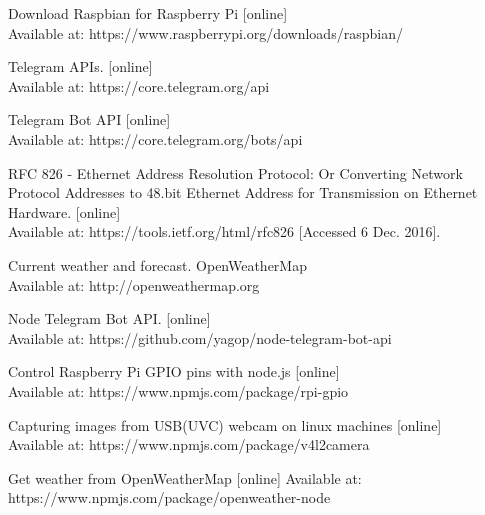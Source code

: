 \documentclass[10pt,journal,compsoc]{IEEEtran}
\begin{document}
\begin{thebibliography}{1}

Download Raspbian for Raspberry Pi [online] \\
Available at: https://www.raspberrypi.org/downloads/raspbian/

Telegram APIs. [online]  \\
Available at: https://core.telegram.org/api

Telegram Bot API [online] \\ 
Available at: https://core.telegram.org/bots/api

RFC 826 - Ethernet Address Resolution Protocol: Or Converting Network Protocol 
Addresses to 48.bit Ethernet Address for Transmission on Ethernet Hardware. [online] \\
Available at: https://tools.ietf.org/html/rfc826 [Accessed 6 Dec. 2016].

Current weather and forecast. OpenWeatherMap \\
Available at: http://openweathermap.org

Node Telegram Bot API. [online] \\
Available at: https://github.com/yagop/node-telegram-bot-api

Control Raspberry Pi GPIO pins with node.js [online] \\
Available at: https://www.npmjs.com/package/rpi-gpio

Capturing images from USB(UVC) webcam on linux machines [online] \\
Available at: https://www.npmjs.com/package/v4l2camera

Get weather from OpenWeatherMap [online]
Available at: https://www.npmjs.com/package/openweather-node

\end{thebibliography}
\end{document}

